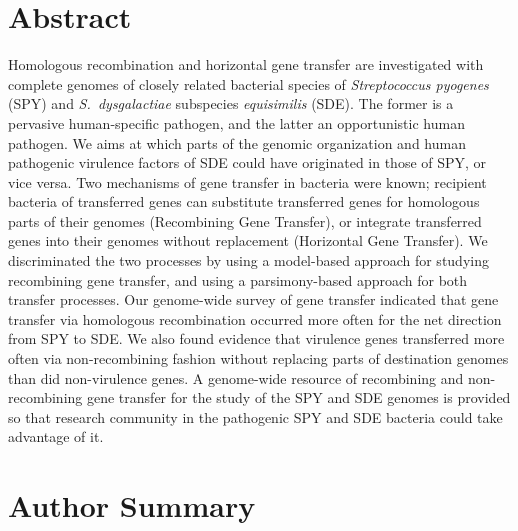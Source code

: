 \documentclass[10pt]{article}
\begin{document}
\section*{Abstract}

Homologous recombination and horizontal gene transfer are investigated with
complete genomes of closely related bacterial species of \textit{Streptococcus
pyogenes} (SPY) and \textit{S.\ dysgalactiae} subspecies \textit{equisimilis}
(SDE).  The former is a pervasive human-specific pathogen, and the latter an
opportunistic human pathogen.  We aims at which parts of the genomic
organization and human pathogenic virulence factors of SDE could have originated
in those of SPY, or vice versa.  Two mechanisms of gene transfer in bacteria
were known; recipient bacteria of transferred genes can substitute transferred
genes for homologous parts of their genomes (Recombining Gene Transfer), or
integrate transferred genes into their genomes without replacement (Horizontal
Gene Transfer).  We discriminated the two processes by using a model-based
approach for studying recombining gene transfer, and using a parsimony-based
approach for both transfer processes.  Our genome-wide survey of gene transfer
indicated that gene transfer via homologous recombination occurred more often
for the net direction from SPY to SDE.  We also found evidence that virulence
genes transferred more often via non-recombining fashion without replacing parts
of destination genomes than did non-virulence genes.  
A genome-wide resource of
recombining and non-recombining gene transfer for the study of the SPY and SDE
genomes is provided so that research community in the pathogenic SPY and SDE
bacteria could take advantage of it. 


\section*{Author Summary}
\end{document}
